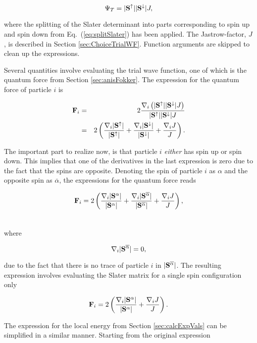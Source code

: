 \begin{equation}
 \Psi_T = |\mathbf{S}^\uparrow||\mathbf{S}^\downarrow |J, \label{eq:phiTrialOptGen}
\end{equation}

where the splitting of the Slater determinant into parts corresponding to spin up and spin down from Eq.~(\ref{eq:splitSlater}) has been applied. The Jastrow-factor, $J$, is described in Section \ref{sec:ChoiceTrialWF}. Function arguments are skipped to clean up the expressions. 

Several quantities involve evaluating the trial wave function, one of which is the quantum force from Section \ref{sec:anisFokker}. The expression for the quantum force of particle $i$ is

\begin{eqnarray}
 \mathbf{F}_i &=& 2\frac{\nabla_i\left(|\mathbf{S}^\uparrow||\mathbf{S}^\downarrow |J\right)}{|\mathbf{S}^\uparrow||\mathbf{S}^\downarrow |J} \nonumber\\
     &=& 2\left(\frac{\nabla_i|\mathbf{S}^\uparrow|}{|\mathbf{S}^\uparrow|} + \frac{\nabla_i|\mathbf{S}^\downarrow|}{|\mathbf{S}^\downarrow|} + \frac{\nabla_i J}{J}\right). \nonumber \\
\end{eqnarray}

The important part to realize now, is that particle $i$ \textit{either} has spin up or spin down. This implies that one of the derivatives in the last expression is zero due to the fact that the spins are opposite. Denoting the spin of particle $i$ as $\alpha$ and the opposite spin as $\overline{\alpha}$, the expressions for the quantum force reads

\begin{align}
 \mathbf{F}_i &= 2\left(\frac{\nabla_i|\mathbf{S}^{\alpha}|}{|\mathbf{S}^{\alpha}|} + \frac{\nabla_i|\mathbf{S}^{\overline{\alpha}}|}{|\mathbf{S}^{\overline{\alpha}}|} + \frac{\nabla_i J}{J}\right), \\ \nonumber
\end{align}

where 

\begin{equation}
 \nabla_i|\mathbf{S}^{\overline{\alpha}}| = 0, \label{eq:differentSpinDie}
\end{equation}

due to the fact that there is no trace of particle $i$ in $|\mathbf{S}^{\overline{\alpha}}|$. The resulting expression involves evaluating the Slater matrix for a single spin configuration only

\begin{equation}
 \mathbf{F}_i = 2\left(\frac{\nabla_i|\mathbf{S}^{\alpha}|}{|\mathbf{S}^{\alpha}|} + \frac{\nabla_i J}{J}\right). \nonumber
\end{equation}

The expression for the local energy from Section \ref{sec:calcExpVals} can be simplified in a similar manner. Starting from the original expression

